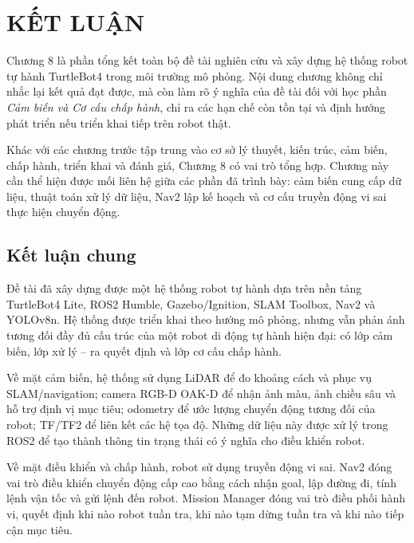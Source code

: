 \providecommand{\placeholderfigure}[3]{%
    \begin{figure}[H]
        \centering
        \fbox{%
            \parbox[c][4.0cm][c]{0.88\textwidth}{%
                \centering
                \textit{#1}%
            }%
        }
        \caption{#2}
        \label{#3}
    \end{figure}
}

\section{KẾT LUẬN}
\label{sec:conclusion}

Chương 8 là phần tổng kết toàn bộ đề tài nghiên cứu và xây dựng hệ thống robot tự hành TurtleBot4 trong môi trường mô phỏng. Nội dung chương không chỉ nhắc lại kết quả đạt được, mà còn làm rõ ý nghĩa của đề tài đối với học phần \textit{Cảm biến và Cơ cấu chấp hành}, chỉ ra các hạn chế còn tồn tại và định hướng phát triển nếu triển khai tiếp trên robot thật.

Khác với các chương trước tập trung vào cơ sở lý thuyết, kiến trúc, cảm biến, chấp hành, triển khai và đánh giá, Chương 8 có vai trò tổng hợp. Chương này cần thể hiện được mối liên hệ giữa các phần đã trình bày: cảm biến cung cấp dữ liệu, thuật toán xử lý dữ liệu, Nav2 lập kế hoạch và cơ cấu truyền động vi sai thực hiện chuyển động.

\subsection{Kết luận chung}
\label{subsec:general-conclusion}

Đề tài đã xây dựng được một hệ thống robot tự hành dựa trên nền tảng TurtleBot4 Lite, ROS2 Humble, Gazebo/Ignition, SLAM Toolbox, Nav2 và YOLOv8n. Hệ thống được triển khai theo hướng mô phỏng, nhưng vẫn phản ánh tương đối đầy đủ cấu trúc của một robot di động tự hành hiện đại: có lớp cảm biến, lớp xử lý -- ra quyết định và lớp cơ cấu chấp hành.

Về mặt cảm biến, hệ thống sử dụng LiDAR để đo khoảng cách và phục vụ SLAM/navigation; camera RGB-D OAK-D để nhận ảnh màu, ảnh chiều sâu và hỗ trợ định vị mục tiêu; odometry để ước lượng chuyển động tương đối của robot; TF/TF2 để liên kết các hệ tọa độ. Những dữ liệu này được xử lý trong ROS2 để tạo thành thông tin trạng thái có ý nghĩa cho điều khiển robot.

Về mặt điều khiển và chấp hành, robot sử dụng truyền động vi sai. Nav2 đóng vai trò điều khiển chuyển động cấp cao bằng cách nhận goal, lập đường đi, tính lệnh vận tốc và gửi lệnh đến robot. Mission Manager đóng vai trò điều phối hành vi, quyết định khi nào robot tuần tra, khi nào tạm dừng tuần tra và khi nào tiếp cận mục tiêu.

